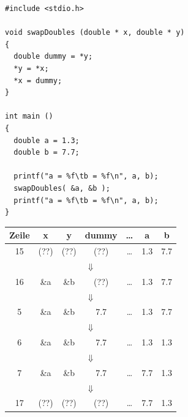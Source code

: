 \begin{frame}[fragile]
%
\begin{tcbraster}[raster columns=2,
                  raster equal height,
                  nobeforeafter,
                  raster column skip=0.2cm]
\begin{codebox}
\begin{verbatim}
#include <stdio.h>

void swapDoubles (double * x, double * y)
{
  double dummy = *y;
  *y = *x;
  *x = dummy;
}

int main ()
{
  double a = 1.3;
  double b = 7.7;
  
  printf("a = %f\tb = %f\n", a, b);
  swapDoubles( &a, &b );
  printf("a = %f\tb = %f\n", a, b);
}
\end{verbatim}
\end{codebox}
%
\begin{tcolorbox}[title=Speicherbild, valign=center]
\renewcommand{\arraystretch}{1.5}
\tiny
\begin{tabular}{c|c|c|c|c|c|c}
Zeile &   x  &   y  & dummy & \ldots &  a  &  b  \\ \hline
15 & (??) & (??) &  (??) & \ldots & 1.3 & 7.7 \\
\multicolumn{7}{c}{$\Downarrow$}\\
16 & \&a  & \&b  &  (??) & \ldots & 1.3 & 7.7 \\
\multicolumn{7}{c}{$\Downarrow$}\\
 5 & \&a  & \&b  &  7.7 & \ldots & 1.3 & 7.7 \\
\multicolumn{7}{c}{$\Downarrow$}\\
 6 & \&a  & \&b  &  7.7 & \ldots & 1.3 & 1.3 \\
\multicolumn{7}{c}{$\Downarrow$}\\
 7 & \&a  & \&b  &  7.7 & \ldots & 7.7 & 1.3 \\
\multicolumn{7}{c}{$\Downarrow$}\\
17 & (??) & (??) &  (??) & \ldots & 7.7 & 1.3 \\
\end{tabular}
\end{tcolorbox}
\end{tcbraster}
%
\end{frame}


